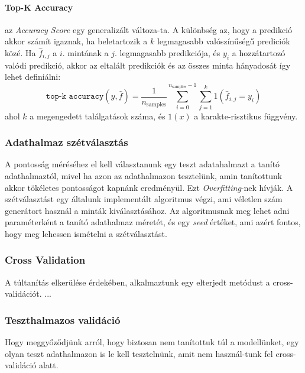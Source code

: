 \documentclass[acmtog, authorversion]{acmart}
\begin{document}
\paragraph{Top-K Accuracy}
az \emph{Accuracy Score} egy generalizált változa-ta. A különbség az, hogy a predikció akkor számít igaznak, ha beletartozik a \begin{math}k\end{math}
legmagasabb valószínűségű prediciók közé. Ha \begin{math}\hat{f}_{i,j}\end{math} a \begin{math}i\end{math}. mintának a \begin{math}j\end{math}. legmagasabb 
predikciója, és \begin{math}y_i\end{math} a hozzátartozó valódi predikció, akkor az eltalált predikciók és az összes minta hányadosát így
lehet definiálni:
\begin{equation}
    \texttt{top-k accuracy}(y, \hat{f}) = \frac{1}{n_\text{samples}} \sum_{i=0}^{n_\text{samples}-1} \sum_{j=1}^{k} 1(\hat{f}_{i,j} = y_i)
\end{equation}
ahol \begin{math}k\end{math} a megengedett találgatások száma, és \begin{math}1(x)\end{math} a karakte-risztikus függvény.
\subsubsection{Adathalmaz szétválasztás}
A pontosság méréséhez el kell választanunk egy teszt adatahalmazt a tanító adathalmaztól, mivel ha azon az adathalmazon tesztelünk, amin tanítottunk
akkor tökéletes pontosságot kapnánk eredményül. Ezt \emph{Overfitting}-nek hívják. A szétválasztást egy általunk implementált algoritmus végzi, ami véletlen szám generátort használ a
minták kiválasztásához. Az algoritmusnak meg lehet adni paraméterként a tanító adathalmaz méretét, és egy \emph{seed} értéket, ami azért fontos, hogy meg
lehessen ismételni a szétválasztást.
\subsubsection{Cross Validation}
A túltanítás elkerülése érdekében, alkalmaztunk egy elterjedt metódust a cross-validációt. ...
\subsubsection{Teszthalmazos validáció}
Hogy meggyőződjünk arról, hogy biztosan nem tanítottuk túl a modellünket, egy olyan teszt adathalmazon is le kell tesztelnünk, amit nem használ-tunk fel
cross-validáció alatt.
\end{document}
